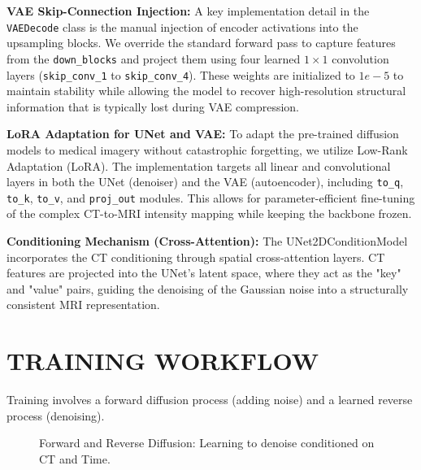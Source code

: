 \documentclass[10pt,a4paper]{article}
\begin{document}
\textbf{VAE Skip-Connection Injection:} 
A key implementation detail in the \texttt{VAEDecode} class is the manual injection of encoder activations into the upsampling blocks. We override the standard forward pass to capture features from the \texttt{down\_blocks} and project them using four learned $1 \times 1$ convolution layers (\texttt{skip\_conv\_1} to \texttt{skip\_conv\_4}). These weights are initialized to $1e-5$ to maintain stability while allowing the model to recover high-resolution structural information that is typically lost during VAE compression.

\textbf{LoRA Adaptation for UNet and VAE:} 
To adapt the pre-trained diffusion models to medical imagery without catastrophic forgetting, we utilize Low-Rank Adaptation (LoRA). The implementation targets all linear and convolutional layers in both the UNet (denoiser) and the VAE (autoencoder), including \texttt{to\_q}, \texttt{to\_k}, \texttt{to\_v}, and \texttt{proj\_out} modules. This allows for parameter-efficient fine-tuning of the complex CT-to-MRI intensity mapping while keeping the backbone frozen.

\textbf{Conditioning Mechanism (Cross-Attention):} 
The UNet2DConditionModel incorporates the CT conditioning through spatial cross-attention layers. CT features are projected into the UNet's latent space, where they act as the "key" and "value" pairs, guiding the denoising of the Gaussian noise into a structurally consistent MRI representation.

\section{TRAINING WORKFLOW}
Training involves a forward diffusion process (adding noise) and a learned reverse process (denoising).

\begin{figure}[H]
\centering
{}
\caption{Forward and Reverse Diffusion: Learning to denoise conditioned on CT and Time.}
\end{figure}
\end{document}
